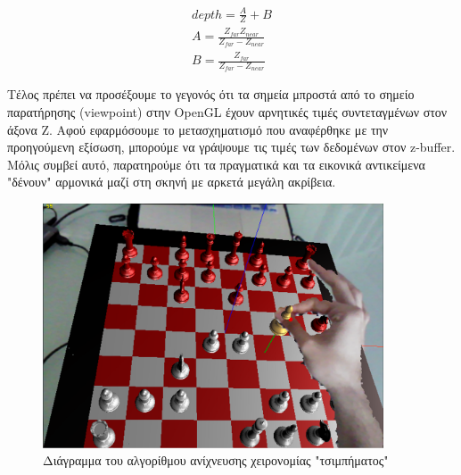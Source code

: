 \begin{equation}
\begin{aligned}
depth=\frac{A}{Z}+B \\
A=\frac{Z_{far}Z_{near}}{Z_{far}-Z_{near}}\\ B=\frac{Z_{far}}{Z_{far}-Z_{near}}
\end{aligned}
\end{equation}

Τέλος πρέπει να προσέξουμε το γεγονός ότι τα σημεία μπροστά από το σημείο παρατήρησης (viewpoint) στην OpenGL έχουν αρνητικές τιμές συντεταγμένων στον άξονα Z. Αφού εφαρμόσουμε το μετασχηματισμό που αναφέρθηκε με την προηγούμενη εξίσωση, μπορούμε να γράψουμε τις τιμές των δεδομένων στον z-buffer. Μόλις συμβεί αυτό, παρατηρούμε ότι τα πραγματικά και τα εικονικά αντικείμενα "δένουν" αρμονικά μαζί στη σκηνή με αρκετά μεγάλη ακρίβεια. 



\begin{figure}[H]
    \centering
    \includegraphics[width=0.9\textwidth]{Files/Figures/correct.png}
    \caption[Διάγραμμα του αλγορίθμου ανίχνευσης χειρονομίας "τσιμπήματος"]{Διάγραμμα του αλγορίθμου ανίχνευσης χειρονομίας "τσιμπήματος"}
    \label{fig:gesture_rec}
\end{figure}











